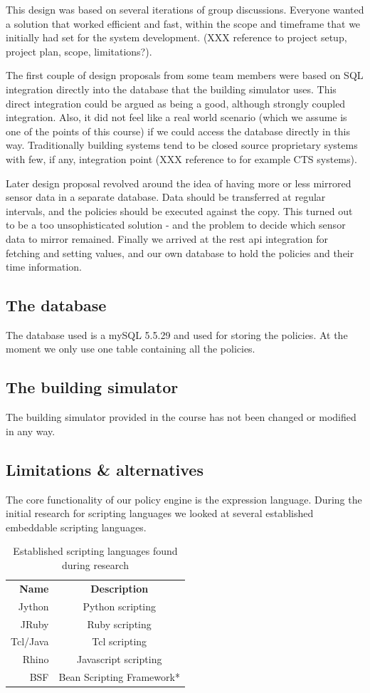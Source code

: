 This design was based on several iterations of group discussions. Everyone wanted a solution that worked efficient and fast, within the scope and timeframe that we initially had set for the system development. (XXX reference to project setup, project plan, scope, limitations?). 

The first couple of design proposals from some team members were based on SQL integration directly into the database that the building simulator uses. This direct integration could be argued as being a good, although strongly coupled integration. Also, it did not feel like a real world scenario (which we assume is one of the points of this course) if we could access the database directly in this way. Traditionally building systems tend to be closed source proprietary systems with few, if any, integration point (XXX reference to for example CTS systems).

Later design proposal revolved around the idea of having more or less mirrored sensor data in a separate database. Data should be transferred at regular intervals, and the policies should be executed against the copy. This turned out to be a too unsophisticated solution - and the problem to decide which sensor data to mirror remained. Finally we arrived at the rest api integration for fetching and setting values, and our own database to hold the policies and their time information.

\subsection{The database}
The database used is a mySQL 5.5.29 and used for storing the policies. At the moment we only use one table containing all the policies.

\subsection{The building simulator}
The building simulator provided in the course has not been changed or modified in any way.

\subsection{Limitations \& alternatives}
The core functionality of our policy engine is the expression language. During the initial research for scripting languages we looked at several established embeddable scripting languages.

\begin{table}[h]
	\center
	\begin{tabular}{rc}
		\textbf{Name}	&	\textbf{Description}\\
		Jython	&	Python scripting\\
		JRuby	&	Ruby scripting\\
		Tcl/Java	&	Tcl scripting\\
		Rhino	&	Javascript scripting\\
		BSF		&	Bean Scripting Framework*
	\end{tabular}
	\caption{Established scripting languages found during research}\label{tbl:design-scripting-languages}
\end{table}

